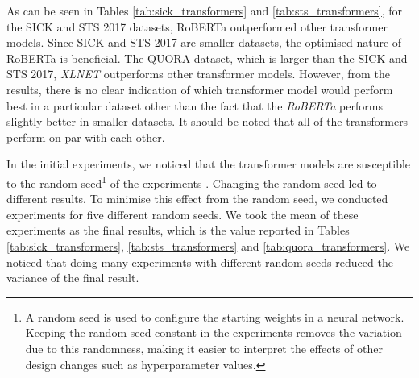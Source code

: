 \begin{table}[htb]
	\centering
	\caption[Results for QUORA with Transformers]{Results for QUORA dataset with different variants of Transformers. For each variant, Root Mean Squared Error (RMSE) reported between the predicted values and the gold labels of the test set. The best result from all of the variations is marked with ${\dagger}$. }  
	\label{tab:quora_transformers}
\end{table}

As can be seen in Tables \ref{tab:sick_transformers} and \ref{tab:sts_transformers}, for the SICK and STS 2017 datasets, RoBERTa outperformed other transformer models. Since SICK and STS 2017 are smaller datasets, the optimised nature of RoBERTa is beneficial. The QUORA dataset, which is larger than the SICK and STS 2017, \textit{XLNET}  outperforms other transformer models. However, from the results, there is no clear indication of which transformer model would perform best in a particular dataset other than the fact that the \textit{RoBERTa} performs slightly better in smaller datasets. It should be noted that all of the transformers perform on par with each other. 

In the initial experiments, we noticed that the transformer models are susceptible to the random seed\footnote{A random seed is used to configure the starting weights in a neural network. Keeping the random seed constant in the experiments removes the variation due to this randomness, making it easier to interpret the effects of other design changes such as hyperparameter values.} of the experiments \autocite{zhang2021revisiting}. Changing the random seed led to different results. To minimise this effect from the random seed, we conducted experiments for five different random seeds. We took the mean of these experiments as the final results, which is the value reported in Tables \ref{tab:sick_transformers}, \ref{tab:sts_transformers} and \ref{tab:quora_transformers}. We noticed that doing many experiments with different random seeds reduced the variance of the final result. 

